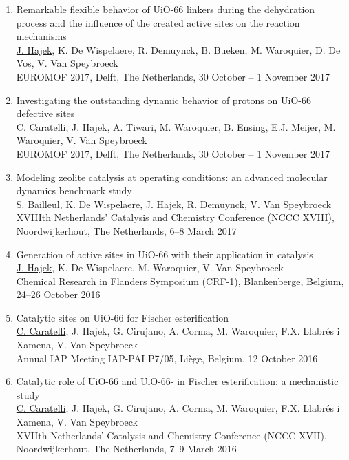\begin{enumerate}

\item
Remarkable flexible behavior of UiO-66 linkers during the dehydration process and the influence of the created active sites on the reaction mechanisms\\
\underline{J. Hajek}, K. De Wispelaere, R. Demuynck, B. Bueken, M. Waroquier, D.
De Vos, V. Van Speybroeck\\
EUROMOF 2017, Delft, The Netherlands, 30 October -- 1 November 2017

\item
Investigating the outstanding dynamic behavior of protons on UiO-66 defective sites\\
\underline{C. Caratelli}, J. Hajek, A. Tiwari, M. Waroquier, B. Ensing, E.J.
Meijer, M. Waroquier, V. Van Speybroeck\\
EUROMOF 2017, Delft, The Netherlands, 30 October -- 1 November 2017

\item
Modeling zeolite catalysis at operating conditions: an advanced molecular dynamics benchmark study\\
\underline{S. Bailleul}, K. De Wispelaere, J. Hajek, R. Demuynck, V. Van
Speybroeck\\
XVIIIth Netherlands' Catalysis and Chemistry Conference (NCCC XVIII),
Noordwijkerhout, The Netherlands, 6--8 March 2017

\item
Generation of active sites in UiO-66 with their application in catalysis\\
\underline{J. Hajek}, K. De Wispelaere, M. Waroquier, V. Van Speybroeck\\
Chemical Research in Flanders Symposium (CRF-1), Blankenberge, Belgium, 24--26
October 2016

\item
Catalytic sites on UiO-66 for Fischer esterification\\
\underline{C. Caratelli}, J. Hajek, G. Cirujano, A. Corma, M. Waroquier, F.X.
Llabr\'es i Xamena, V. Van Speybroeck\\
Annual IAP Meeting IAP-PAI P7/05, Li\`ege, Belgium, 12 October 2016
\item
Catalytic role of UiO-66 and UiO-66- in Fischer esterification: a
mechanistic study\\
\underline{C. Caratelli}, J. Hajek, G. Cirujano, A. Corma, M. Waroquier, F.X.
Llabr\'es i Xamena, V. Van Speybroeck\\
XVIIth Netherlands' Catalysis and Chemistry Conference (NCCC XVII),
Noordwijkerhout, The Netherlands, 7--9 March 2016


\end{enumerate}
